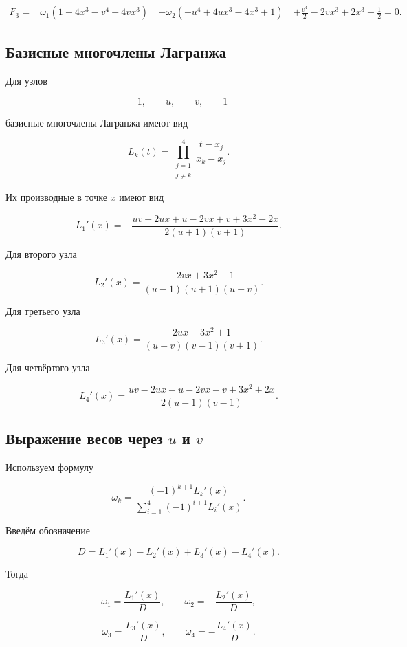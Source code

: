 \documentclass[12pt,a4paper]{article}
\begin{document}
	$$
	\boxed{
		\begin{aligned}
			F_3={}&
			\omega_1(1+4x^3-v^4+4vx^3)
			\
			&+\omega_2(-u^4+4ux^3-4x^3+1)
			\
			&+\frac{v^4}{2}
			-2vx^3
			+2x^3-\frac12
			=0.
		\end{aligned}
	}
	$$
	
	\subsection{Базисные многочлены Лагранжа}
	
	Для узлов
	
	$$
	-1,\qquad u,\qquad v,\qquad 1
	$$
	
	базисные многочлены Лагранжа имеют вид
	
	$$
	L_k(t)
	=
	\prod_{\substack{j=1\\j\ne k}}^4
	\frac{t-x_j}{x_k-x_j}.
	$$
	
	Их производные в точке $x$ имеют вид
	
	$$
	\boxed{
		L_1'(x)=
		-\frac{
			uv-2ux+u-2vx+v+3x^2-2x
		}{
			2(u+1)(v+1)
		}.
	}
	$$
	
	Для второго узла
	
	$$
	\boxed{
		L_2'(x)=
		\frac{
			-2vx+3x^2-1
		}{
			(u-1)(u+1)(u-v)
		}.
	}
	$$
	
	Для третьего узла
	
	$$
	\boxed{
		L_3'(x)=
		\frac{
			2ux-3x^2+1
		}{
			(u-v)(v-1)(v+1)
		}.
	}
	$$
	
	Для четвёртого узла
	
	$$
	\boxed{
		L_4'(x)=
		\frac{
			uv-2ux-u-2vx-v+3x^2+2x
		}{
			2(u-1)(v-1)
		}.
	}
	$$
	
	\subsection{Выражение весов через $u$ и $v$}
	
	Используем формулу
	
	$$
	\omega_k=
	\frac{
		(-1)^{k+1}L_k'(x)
	}{
		\displaystyle
		\sum_{i=1}^4(-1)^{i+1}L_i'(x)
	}.
	$$
	
	Введём обозначение
	
	$$
	\boxed{
		D=
		L_1'(x)-L_2'(x)+L_3'(x)-L_4'(x).
	}
	$$
	
	Тогда
	
	$$
	\boxed{
		\omega_1=\frac{L_1'(x)}{D},
		\qquad
		\omega_2=-\frac{L_2'(x)}{D},
	}
	$$
	
	$$
	\boxed{
		\omega_3=\frac{L_3'(x)}{D},
		\qquad
		\omega_4=-\frac{L_4'(x)}{D}.
	}
	$$
	
\end{document}
